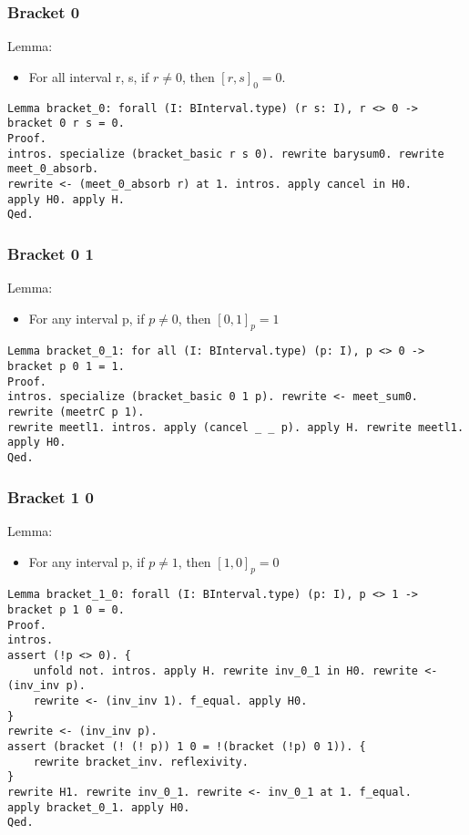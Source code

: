 \documentclass[a4paper,10pt]{article} %
\begin{document}
\subsubsection{Bracket 0}
Lemma:
\begin{itemize}
    \item For all interval r, s, if $r \neq 0$, then $[r, s]_0 = 0$.
\end{itemize}
\begin{lstlisting}
Lemma bracket_0: forall (I: BInterval.type) (r s: I), r <> 0 -> bracket 0 r s = 0.
Proof.
intros. specialize (bracket_basic r s 0). rewrite barysum0. rewrite meet_0_absorb.
rewrite <- (meet_0_absorb r) at 1. intros. apply cancel in H0.
apply H0. apply H.
Qed.
\end{lstlisting}

\subsubsection{Bracket 0 1}
Lemma:
\begin{itemize}
    \item For any interval p, if $p \neq 0$, then $[0, 1]_p = 1$
\end{itemize}
\begin{lstlisting}
Lemma bracket_0_1: for all (I: BInterval.type) (p: I), p <> 0 -> bracket p 0 1 = 1.
Proof.
intros. specialize (bracket_basic 0 1 p). rewrite <- meet_sum0. rewrite (meetrC p 1). 
rewrite meetl1. intros. apply (cancel _ _ p). apply H. rewrite meetl1. apply H0.
Qed.
\end{lstlisting}

\subsubsection{Bracket 1 0}
Lemma:
\begin{itemize}
    \item For any interval p, if $p \neq 1$, then $[1, 0]_p = 0$
\end{itemize}
\begin{lstlisting}
Lemma bracket_1_0: forall (I: BInterval.type) (p: I), p <> 1 -> bracket p 1 0 = 0.
Proof.
intros.
assert (!p <> 0). {
    unfold not. intros. apply H. rewrite inv_0_1 in H0. rewrite <- (inv_inv p).
    rewrite <- (inv_inv 1). f_equal. apply H0. 
} 
rewrite <- (inv_inv p).
assert (bracket (! (! p)) 1 0 = !(bracket (!p) 0 1)). {
    rewrite bracket_inv. reflexivity.
}
rewrite H1. rewrite inv_0_1. rewrite <- inv_0_1 at 1. f_equal.
apply bracket_0_1. apply H0.
Qed.
\end{lstlisting}
\end{document}
